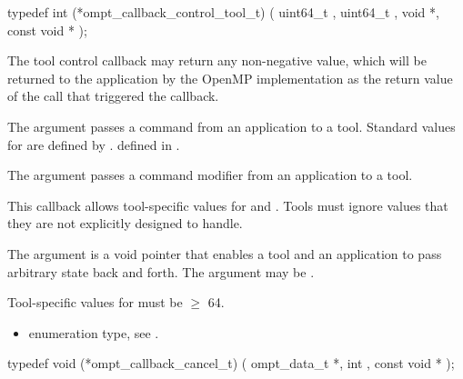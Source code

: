 \begin{ccppspecific}
\begin{omptCallback}
typedef int (*ompt_callback_control_tool_t) (
  uint64_t ,
  uint64_t ,
  void *,
  const void *
);
\end{omptCallback}
\end{ccppspecific}


\descr

The tool control callback may return any non-negative value, which will be returned to the 
application by the OpenMP implementation as the return value of the 
 call that triggered the callback.

\argdesc 

The argument  passes a command from an application
to a tool.  Standard values for  are defined by
.  defined in .

The argument  passes a command modifier from an
application to a tool.

This callback allows tool-specific values for  and
.  Tools must ignore  values that they are
not explicitly designed to handle.

The argument  is a void pointer that enables a tool and
an application to pass arbitrary state back and forth. 
The argument  may be .

\codeptrdesc


\constraints
Tool-specific values for  must be $\geq$ 64.

\crossreferences
\begin{itemize}
\item {} enumeration type, see .
\end{itemize}

\label{sec:ompt_callback_cancel_t}
\format

\begin{ccppspecific}
\begin{omptCallback}
typedef void (*ompt_callback_cancel_t) (
  ompt_data_t *,
  int ,
  const void *
);
\end{omptCallback}
\end{ccppspecific}


